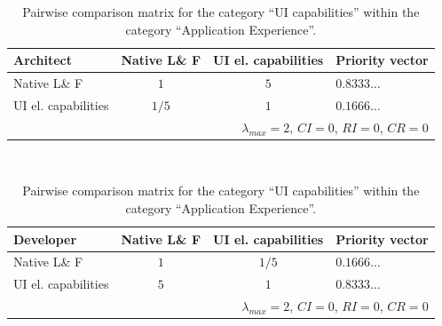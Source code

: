 \begin{table}[h!]
    \begin{center}
        \begin{tabular}{lccl}
            \hline
            \textbf{Architect}  & Native L\& F & UI el. capabilities & Priority vector \\
            \hline
            Native L\& F        & $1$          & $5$                 & $0.8333\ldots$  \\
            UI el. capabilities & $1/5$        & $1$                 & $0.1666\ldots$  \\
            \hline
            \multicolumn{4}{r}{$\lambda_{max} = 2$, $CI = 0$, $RI = 0$, $CR = 0$}      \\
            \hline
        \end{tabular}
        \\\vspace{1em}
        \begin{tabular}{lccl}
            \hline
            \textbf{Developer}  & Native L\& F & UI el. capabilities & Priority vector \\
            \hline
            Native L\& F        & $1$          & $1/5$               & $0.1666\ldots$  \\
            UI el. capabilities & $5$          & $1$                 & $0.8333\ldots$  \\
            \hline
            \multicolumn{4}{r}{$\lambda_{max} = 2$, $CI = 0$, $RI = 0$, $CR = 0$}      \\
            \hline
        \end{tabular}
        \caption{Pairwise comparison matrix for the category ``UI capabilities'' within the category ``Application Experience''.}
        \label{tab:ui}
    \end{center}
\end{table}

